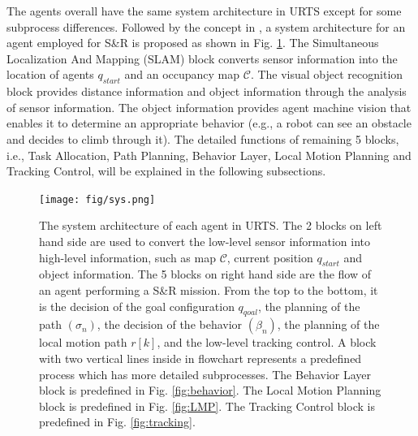 \documentclass{ieeeaccess}
\begin{document}
The agents overall have the same system architecture in URTS except for some subprocess differences. Followed by the concept in \cite{paden2016survey}, a system architecture for an agent employed for S\&R is proposed as shown in Fig. \ref{fig:sys}. The Simultaneous Localization And Mapping (SLAM) block converts sensor information into the location of agents $q_{start}$ and an occupancy map $\mathcal{C}$. The visual object recognition block provides distance information and object information through the analysis of sensor information. The object information provides agent machine vision that enables it to determine an appropriate behavior (e.g., a robot can see an obstacle and decides to climb through it). The detailed functions of remaining 5 blocks, i.e., Task Allocation, Path Planning, Behavior Layer, Local Motion Planning and Tracking Control, will be explained in the following subsections.


\begin{figure}[htbp]
    \centering
    \texttt{[image: fig/sys.png]}\caption{The system architecture of each agent in URTS. The 2 blocks on left hand side are used to convert the low-level sensor information into high-level information, such as map $\mathcal{C}$, current position $q_{start}$ and object information. The 5 blocks on right hand side are the flow of an agent performing a S\&R mission. From the top to the bottom, it is the decision of the goal configuration $q_{qoal}$, the planning of the path $(\sigma_n)$, the decision of the behavior $(\beta_n)$, the planning of the local motion path $r[k]$, and the low-level tracking control. A block with two vertical lines inside in flowchart represents a predefined process which has more detailed subprocesses. The Behavior Layer block is predefined in Fig. \ref{fig:behavior}. The Local Motion Planning block is predefined in Fig. \ref{fig:LMP}. The Tracking Control block is predefined in Fig. \ref{fig:tracking}.}
    \label{fig:sys}
\end{figure}
\end{document}
